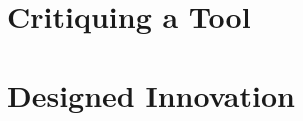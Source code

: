 \documentclass{sigchi}
\begin{document}
\section{Critiquing a Tool}


\section{Designed Innovation}



\balance{}



\end{document}

